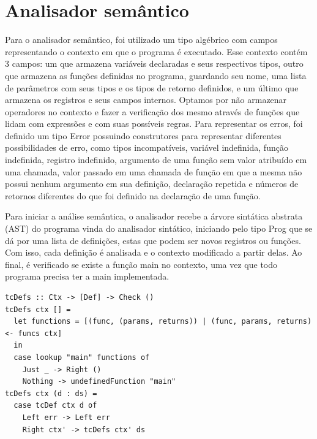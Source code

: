 \documentclass{article}
\begin{document}
\section{Analisador semântico}
    Para o analisador semântico, foi utilizado um tipo algébrico com campos representando o contexto em que o programa é executado. Esse contexto contém 3 campos: um que armazena variáveis declaradas e seus respectivos tipos, outro que armazena as funções definidas no programa, guardando seu nome, uma lista de parâmetros com seus tipos e os tipos de retorno definidos, e um último que armazena os registros e seus campos internos. Optamos por não armazenar operadores no contexto e fazer a verificação dos mesmo através de funções que lidam com expressões e com suas possíveis regras. Para representar os erros, foi definido um tipo Error possuindo construtores para representar diferentes possibilidades de erro, como tipos incompatíveis, variável indefinida, função indefinida, registro indefinido, argumento de uma função sem valor atribuído em uma chamada, valor passado em uma chamada de função em que a mesma não possui nenhum argumento em sua definição, declaração repetida e números de retornos diferentes do que foi definido na declaração de uma função.

    Para iniciar a análise semântica, o analisador recebe a árvore sintática abstrata (AST) do programa vinda do analisador sintático, iniciando pelo tipo Prog que se dá por uma lista de definições, estas que podem ser novos registros ou funções. Com isso, cada definição é analisada e o contexto modificado a partir delas. Ao final, é verificado se existe a função main no contexto, uma vez que todo programa precisa ter a main implementada.

    \begin{lstlisting}
tcDefs :: Ctx -> [Def] -> Check ()
tcDefs ctx [] =
  let functions = [(func, (params, returns)) | (func, params, returns) <- funcs ctx]
  in
  case lookup "main" functions of
    Just _ -> Right ()
    Nothing -> undefinedFunction "main"
tcDefs ctx (d : ds) =
  case tcDef ctx d of
    Left err -> Left err
    Right ctx' -> tcDefs ctx' ds
    \end{lstlisting}
\end{document}
